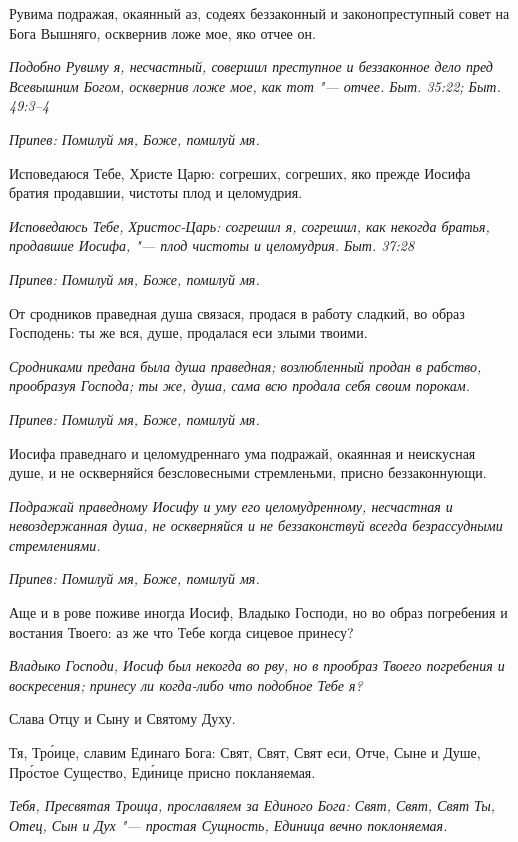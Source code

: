 Рувима подражая, окаянный аз, содеях беззаконный и законопреступный совет на Бога Вышняго, осквернив ложе мое, яко отчее он.


\itshape Подобно Рувиму я, несчастный, совершил преступное и беззаконное дело пред Всевышним Богом, осквернив ложе мое, как тот "--- отчее. Быт. 35:22; Быт. 49:3–4\normalfont{}


\itshape Припев:\normalfont{} Помилуй мя, Боже, помилуй мя.


Исповедаюся Тебе, Христе Царю: согреших, согреших, яко прежде Иосифа братия продавшии, чистоты плод и целомудрия.


\itshape Исповедаюсь Тебе, Христос-Царь: согрешил я, согрешил, как некогда братья, продавшие Иосифа, "--- плод чистоты и целомудрия. Быт. 37:28\normalfont{}


\itshape Припев:\normalfont{} Помилуй мя, Боже, помилуй мя.


От сродников праведная душа связася, продася в работу сладкий, во образ Господень: ты же вся, душе, продалася еси злыми твоими.


\itshape Сродниками предана была душа праведная; возлюбленный продан в рабство, прообразуя Господа; ты же, душа, сама всю продала себя своим порокам.\normalfont{}


\itshape Припев:\normalfont{} Помилуй мя, Боже, помилуй мя.


Иосифа праведнаго и целомудреннаго ума подражай, окаянная и неискусная душе, и не оскверняйся безсловесными стремленьми, присно беззаконнующи.


\itshape Подражай праведному Иосифу и уму его целомудренному, несчастная и невоздержанная душа, не оскверняйся и не беззаконствуй всегда безрассудными стремлениями.\normalfont{}


\itshape Припев:\normalfont{} Помилуй мя, Боже, помилуй мя.


Аще и в рове поживе иногда Иосиф, Владыко Господи, но во образ погребения и востания Твоего: аз же что Тебе когда сицевое принесу?


\itshape Владыко Господи, Иосиф был некогда во рву, но в прообраз Твоего погребения и воскресения; принесу ли когда-либо что подобное Тебе я?\normalfont{}


Слава Отцу и Сыну и Святому Духу.


Тя, Тро́ице, славим Единаго Бога: Свят, Свят, Свят еси, Отче, Сыне и Душе, Про́стое Существо, Еди́нице присно покланяемая.


\itshape Тебя, Пресвятая Троица, прославляем за Единого Бога: Свят, Свят, Свят Ты, Отец, Сын и Дух "--- простая Сущность, Единица вечно поклоняемая.\normalfont{}


